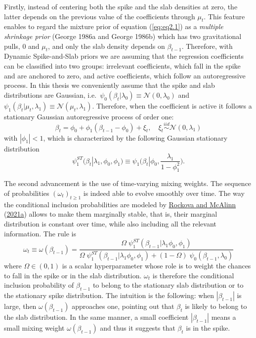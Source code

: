 \documentclass[
  12pt,
]{book}
\theoremstyle{break}
\theoremstyle{nonumberplain}
\begin{document}
Firstly, instead of centering both the spike and the slab densities at
zero, the latter depends on the previous value of the coefficients
through \(\mu_{t}\). This feature enables to regard the mixture prior of
equation (\ref{eq:eq2.1}) as a \emph{multiple shrinkage prior} (George
1986a and George 1986b) which has two gravitational pulls, \(0\) and
\(\mu_{t}\), and only the slab density depends on \(\beta_{t-1}\).
Therefore, with Dynamic Spike-and-Slab priors we are assuming that the
regression coefficients can be classified into two groups: irrelevant
coefficients, which fall in the spike and are anchored to zero, and
active coefficients, which follow an autoregressive process. In this
thesis we conveniently assume that the spike and slab distributions are
Gaussian,
i.e.~\(\psi_{0}(\beta_{t}|\lambda_{0}) \equiv \mathcal{N}(0,\lambda_{0})\)
and
\(\psi_{1}(\beta_{t}|\mu_{t},\lambda_{1})\equiv \mathcal{N}(\mu_{t},\lambda_{1})\).
Therefore, when the coefficient is active it follows a stationary
Gaussian autoregressive process of order one:
\begin{equation}\label{eq:betaevol}
\beta_{t}=\phi_{0}+\phi_{1}(\beta_{t-1}-\phi_{0})+\xi_{t}, \quad \xi_{t}\overset{iid}{\sim}\mathcal{N}(0,\lambda_{1})
\end{equation} with \(|\phi_1|<1\), which is characterized by the
following Gaussian stationary distribution \begin{equation}
\psi_{1}^{ST}(\beta_{t}|\lambda_{1},\phi_{0},\phi_{1})\equiv \psi_{1}\bigg(\beta_{t}|\phi_{0},\frac{\lambda_{1}}{1-\phi_{1}^{2}}\bigg).
\end{equation}

The second advancement is the use of time-varying mixing weights. The
sequence of probabilities \((\omega_t)_{t \geq 1}\) is indeed able to
evolve smoothly over time. The way the conditional inclusion
probabilities are modeled by
\protect\hyperlink{ref-rockova_mcalinn_2021}{Rockova and McAlinn}
(\protect\hyperlink{ref-rockova_mcalinn_2021}{2021a}) allows to make
them marginally stable, that is, their marginal distribution is constant
over time, while also including all the relevant information. The rule
is \begin{equation}\label{eq:eq2.8}
\omega_{t}\equiv \omega{(\beta_{t-1})}=\frac{\Omega \; \psi_{1}^{ST}(\beta_{t-1}|\lambda_{1}\phi_{0},\phi_{1})}{\Omega \; \psi_{1}^{ST}(\beta_{t-1}|\lambda_{1}\phi_{0},\phi_{1})+(1-\Omega)\; \psi_{0}(\beta_{t-1},\lambda_{0})}
\end{equation} where \(\Omega \in (0,1)\) is a scalar hyperparameter
whose role is to weight the chances to fall in the spike or in the slab
distribution. \(\omega_{t}\) is therefore the conditional inclusion
probability of \(\beta_{t-1}\) to belong to the stationary slab
distribution or to the stationary spike distribution. The intuition is
the following: when \(|\beta_{t-1}|\) is large, then
\(\omega(\beta_{t-1})\) approaches one, pointing out that \(\beta_{t}\)
is likely to belong to the slab distribution. In the same manner, a
small coefficient \(|\beta_{t-1}|\) means a small mixing weight
\(\omega(\beta_{t-1})\) and thus it suggests that \(\beta_{t}\) is in
the spike.
\end{document}
